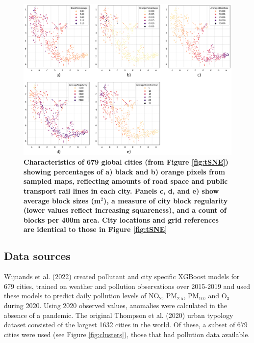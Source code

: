 \documentclass[preprint,12pt]{elsarticle}
\begin{document}
\begin{figure}
\centering

\includegraphics[trim={ 0 0 0 0 },clip,scale=0.35]{Images/City_Types_Dimension_chessboard.png}

\caption{\bf Characteristics of 679 global cities (from Figure \ref{fig:tSNE}) showing percentages of a) black and b) orange pixels from sampled maps\cite{Thompson2020}, reflecting amounts of road space and public transport rail lines in each city. Panels c, d, and e) show average block sizes (m$^{2}$), a measure of city block regularity (lower values reflect increasing squareness), and a count of blocks per 400m area\cite{Nice2019b}. City locations and grid references are identical to those in Figure \ref{fig:tSNE}}
 \label{fig:Dimensions}
\end{figure}




\subsection*{Data sources}\label{sec:datasources}


Wijnands et al. (2022)\cite{Wijnands2022} created pollutant and city specific XGBoost models for 679 cities, trained on weather and pollution observations over 2015-2019 and used these models to predict daily pollution levels of NO$_{2}$, PM$_{2.5}$, PM$_{10}$, and O$_{3}$ during 2020. Using 2020 observed values, anomalies were calculated in the absence of a pandemic. The original Thompson et al. (2020)\cite{Thompson2020} urban typology dataset consisted of the largest 1632 cities in the world. Of these, a subset of 679 cities were used (see Figure \ref{fig:clusters}), those that had pollution data available.
\end{document}
